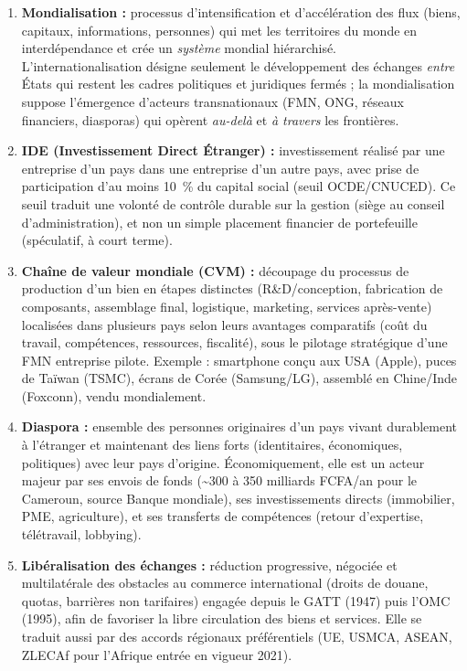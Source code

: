 \documentclass[11pt]{article}
\newcommand{\cle}[1]{{\popxbold\color{popdark}#1}}
\begin{document}
\begin{corrige}
\begin{enumerate}
    \item \textbf{Mondialisation :} processus d'intensification et d'accélération des flux (biens, capitaux, informations, personnes) qui met les territoires du monde en interdépendance et crée un \emph{système} mondial hiérarchisé. L'\cle{internationalisation} désigne seulement le développement des échanges \emph{entre} États qui restent les cadres politiques et juridiques fermés ; la mondialisation suppose l'émergence d'acteurs transnationaux (FMN, ONG, réseaux financiers, diasporas) qui opèrent \emph{au-delà} et \emph{à travers} les frontières.
    \item \textbf{IDE (Investissement Direct Étranger) :} investissement réalisé par une entreprise d'un pays dans une entreprise d'un autre pays, avec prise de participation d'au moins \SI{10}{\%} du capital social (seuil OCDE/CNUCED). Ce seuil traduit une \cle{volonté de contrôle} durable sur la gestion (siège au conseil d'administration), et non un simple placement financier de portefeuille (spéculatif, à court terme).
    \item \textbf{Chaîne de valeur mondiale (CVM) :} découpage du processus de production d'un bien en étapes distinctes (R\&D/conception, fabrication de composants, assemblage final, logistique, marketing, services après-vente) localisées dans plusieurs pays selon leurs avantages comparatifs (coût du travail, compétences, ressources, fiscalité), sous le pilotage stratégique d'une FMN \cle{entreprise pilote}. Exemple : smartphone conçu aux USA (Apple), puces de Taïwan (TSMC), écrans de Corée (Samsung/LG), assemblé en Chine/Inde (Foxconn), vendu mondialement.
    \item \textbf{Diaspora :} ensemble des personnes originaires d'un pays vivant durablement à l'étranger et maintenant des liens forts (identitaires, économiques, politiques) avec leur pays d'origine. Économiquement, elle est un acteur majeur par ses \cle{envois de fonds} (\textasciitilde 300 à 350 milliards FCFA/an pour le Cameroun, source Banque mondiale), ses investissements directs (immobilier, PME, agriculture), et ses transferts de compétences (retour d'expertise, télétravail, lobbying).
    \item \textbf{Libéralisation des échanges :} réduction progressive, négociée et multilatérale des obstacles au commerce international (droits de douane, quotas, barrières non tarifaires) engagée depuis le GATT (1947) puis l'OMC (1995), afin de favoriser la libre circulation des biens et services. Elle se traduit aussi par des accords régionaux préférentiels (UE, USMCA, ASEAN, \cle{ZLECAf} pour l'Afrique entrée en vigueur 2021).
\end{enumerate}
\end{corrige}
\end{document}
